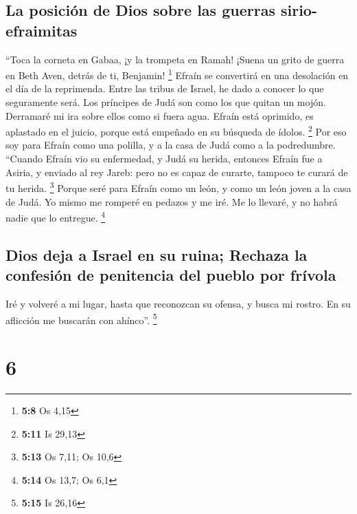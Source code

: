 \hypertarget{la-posiciuxf3n-de-dios-sobre-las-guerras-sirio-efraimitas}{%
\subsection{La posición de Dios sobre las guerras
sirio-efraimitas}\label{la-posiciuxf3n-de-dios-sobre-las-guerras-sirio-efraimitas}}

 ``Toca la corneta en Gabaa, ¡y la trompeta en Ramah!
¡Suena un grito de guerra en Beth Aven, detrás de ti, Benjamin!
\footnote{\textbf{5:8} Os 4,15}  Efraín se convertirá en
una desolación en el día de la reprimenda. Entre las tribus de Israel,
he dado a conocer lo que seguramente será.  Los príncipes
de Judá son como los que quitan un mojón. Derramaré mi ira sobre ellos
como si fuera agua.  Efraín está oprimido, es aplastado
en el juicio, porque está empeñado en su búsqueda de ídolos. \footnote{\textbf{5:11}
  Is 29,13}  Por eso soy para Efraín como una polilla, y
a la casa de Judá como a la podredumbre.  ``Cuando Efraín
vio su enfermedad, y Judá su herida, entonces Efraín fue a Asiria, y
enviado al rey Jareb: pero no es capaz de curarte, tampoco te curará de
tu herida. \footnote{\textbf{5:13} Os 7,11; Os 10,6} 
Porque seré para Efraín como un león, y como un león joven a la casa de
Judá. Yo mismo me romperé en pedazos y me iré. Me lo llevaré, y no habrá
nadie que lo entregue. \footnote{\textbf{5:14} Os 13,7; Os 6,1}

\hypertarget{dios-deja-a-israel-en-su-ruina-rechaza-la-confesiuxf3n-de-penitencia-del-pueblo-por-fruxedvola}{%
\subsection{Dios deja a Israel en su ruina; Rechaza la confesión de
penitencia del pueblo por
frívola}\label{dios-deja-a-israel-en-su-ruina-rechaza-la-confesiuxf3n-de-penitencia-del-pueblo-por-fruxedvola}}

 Iré y volveré a mi lugar, hasta que reconozcan su
ofensa, y busca mi rostro. En su aflicción me buscarán con ahínco''.
\footnote{\textbf{5:15} Is 26,16}

\hypertarget{section-5}{%
\section{6}\label{section-5}}

